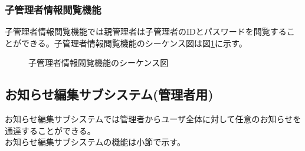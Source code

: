 \documentclass[a4j]{jarticle}
\begin{document}
 \subsubsection{子管理者情報閲覧機能}
 子管理者情報閲覧機能では親管理者は子管理者のIDとパスワードを閲覧することができる。子管理者情報閲覧機能のシーケンス図は図\ref{fig:admin_children-reading.png}に示す。
           \begin{figure}[H]
\centering
{}
\caption{子管理者情報閲覧機能のシーケンス図}
\label{fig:admin_children-reading.png}
\end{figure}
   \subsection{お知らせ編集サブシステム(管理者用)}
 お知らせ編集サブシステムでは管理者からユーザ全体に対して任意のお知らせを通達することができる。\\
 お知らせ編集サブシステムの機能は小節で示す。
\end{document}
